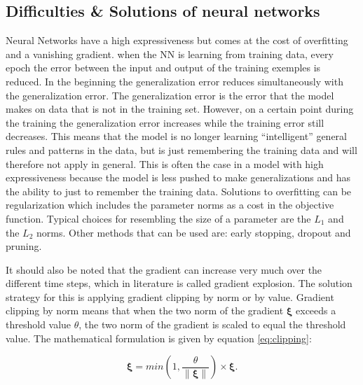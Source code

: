 \subsection{Difficulties \& Solutions of neural networks}\label{s:Problems}
Neural Networks have a high expressiveness but comes at the cost of overfitting and a vanishing gradient.
when the NN is learning from training data, every epoch the error between the input and output of the training exemples is reduced. In the beginning the generalization error reduces simultaneously with the generalization error. The generalization error is the error that the model makes on data that is not in the training set. However, on a certain point during the training the generalization error increases while the training error still decreases. This means that the model is no longer learning ``intelligent'' general rules and patterns in the data, but is just remembering the training data and will therefore not apply in general. This is often the case in a model with high expressiveness because the model is less pushed to make generalizations and has the ability to just to remember the training data. Solutions to overfitting can be regularization which includes the parameter norms as a cost in the objective function. Typical choices for resembling the size of a parameter are the $ L_1 $ and the $ L_2 $ norms. Other methods that can be used are: early stopping, dropout and pruning.

It should also be noted that the gradient can increase very much over the different time steps, which in literature is called gradient explosion. The solution strategy for this is applying gradient clipping by norm or by value. Gradient clipping by norm means that when the two norm of the gradient $ \bm{\xi} $ exceeds a threshold value $ \theta $, the two norm of the gradient is scaled to equal the threshold value. The mathematical formulation is given by equation \ref{eq:clipping}:

\begin{equation}\label{eq:clipping}
	\bm{\xi}= min(1,\frac{\theta}{\| \bm{\xi} \|})\times\bm{\xi}.
\end{equation}


